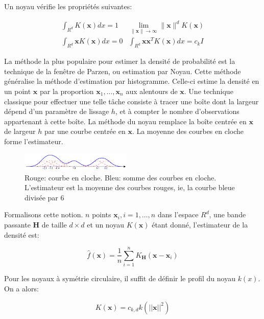 \documentclass{article}
\begin{document}
Un noyau vérifie les propriétés suivantes:

\begin{align*}
\int_{R^d} K(\mathbf{x})dx = 1 & \lim_{\|\mathbf{x}\| \rightarrow \infty}
\|\mathbf{x}\|^d K(\mathbf{x}) \\
\int_{R^d} \mathbf{x} K(\mathbf{x}) dx = 0 & \int_{R^d} \mathbf{xx}^T
K(\mathbf{x}) dx = c_k I
\end{align*}

La méthode la plus populaire pour estimer la densité de probabilité est la
technique de la fenêtre de Parzen, ou estimation par Noyau. Cette méthode
généralise la méthode d'estimation par histogramme. Celle-ci estime la densité
en un point $\mathbf{x}$ par la proportion $\mathbf{x}_1, \dots, \mathbf{x}_n$
aux alentours de $\mathbf{x}$. Une
technique classique pour effectuer une telle tâche consiste à tracer une boîte
dont la largeur dépend d'un paramètre de lissage $h$, et à compter le nombre
d'observations appartenant à cette boîte.
La méthode du noyau remplace la boîte centrée en $\mathbf{x}$ de largeur $h$ par une
courbe centrée en $\mathbf{x}$. La moyenne des courbes en cloche forme
l'estimateur.

\begin{figure}[h]
\begin{center}
\includegraphics[width=200px]{images/Parzen_window_illustration.png}
\end{center}
\caption{Rouge: courbe en cloche. Bleu: somme des courbes en cloche.
L'estimateur est la moyenne des courbes rouges, ie, la courbe bleue divisée
par $6$}
\end{figure}

Formalisons cette notion. $n$ points $\mathbf{x}_i, i = 1, \dots, n$
dans l'espace $R^d$, une bande passante $\mathbf{H}$ de taille $d \times d$ et un noyau
$K(\mathbf{x})$ étant donné, l'estimateur de la densité est:

\begin{equation}
\hat{f}(\mathbf{x}) = \frac{1}{n} \sum_{i = 1}^n K_\mathbf{H}(\mathbf{x} - \mathbf{x}_i)
\end{equation}

Pour les noyaux à symétrie circulaire, il suffit de définir le profil du
noyau $k(x)$. On a alors:

\begin{equation}
K(\mathbf{x}) = c_{k, d} k (|| \mathbf{x} ||^2)
\end{equation}
\end{document}
